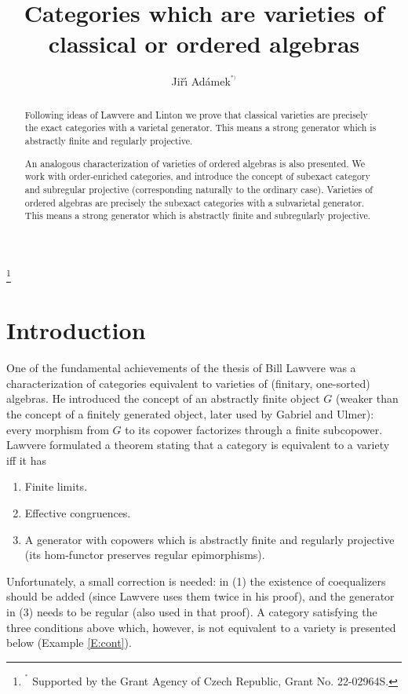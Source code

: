 \documentclass[12pt,amstex,leqno]{amsart}
\theoremstyle{definition}
\numberwithin{equation}{section}
\begin{document}
	
	\title[Categories which are varieties]{Categories which are varieties of classical or ordered algebras}
	\author[Ji{\v{r}}{\'{\i}} Ad{\'{a}}mek]{Ji{\v{r}}{\'{\i}} Ad{\'{a}}mek$^{^{\ast)}}$}
	
	
	
	\begin{abstract}
		Following ideas of Lawvere and Linton we prove that  classical varieties are precisely the exact categories with a varietal generator. This means a strong generator which is abstractly finite and regularly projective.
		
		
		An analogous characterization of varieties of ordered algebras is also presented. We work  with order-enriched categories, and introduce the concept of subexact category and subregular projective  (corresponding naturally to the ordinary case). 
		Varieties of ordered algebras are precisely the subexact categories with a subvarietal generator. This means a strong generator which is abstractly finite and subregularly projective.
	\end{abstract}
	\footnote{$^{^\ast}$ Supported by the Grant Agency of Czech Republic, Grant No. 22-02964S.}
	
	\maketitle
	
	\section{Introduction}\label{sec1}
	One of the fundamental achievements of the thesis of Bill Lawvere was a characterization of categories equivalent to varieties of (finitary, one-sorted) algebras.
	He introduced the concept of an abstractly finite object $G$ (weaker than the concept of a finitely generated object, later used by Gabriel and Ulmer): every morphism from $G$ to its copower factorizes through a finite subcopower. 
	Lawvere formulated a theorem stating that a category is equivalent to a variety iff it has
	\begin{enumerate}
		\item[(1)] Finite limits.
		
		\item[(2)] Effective congruences.
		
		\item[(3)] A generator  with copowers which is  abstractly finite and regularly projective (its hom-functor preserves regular epimorphisms).
	\end{enumerate}
	Unfortunately, a small correction is needed: in (1) the existence of coequalizers should  be added (since Lawvere uses them twice in his proof), and the generator in (3) needs to be regular (also used in that proof). A category satisfying the three conditions above which, however, is not equivalent to a variety is presented below (Example \ref{E:cont}).
	
\end{document}
